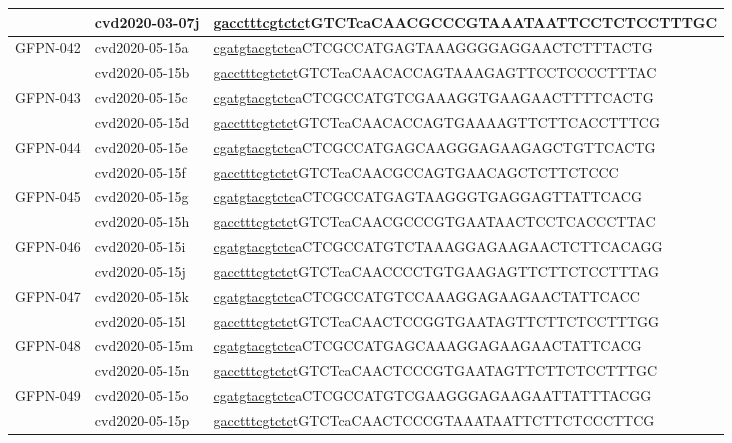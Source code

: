 \begin{landscape}
\begin{longtable}{|l|l|l|}
		& cvd2020-03-07j & \underline{gacctttcgtctc}tGTCTcaCAACGCCCGTAAATAATTCCTCTCCTTTGC \\ \hline
		\multirow{2}{*}{GFPN-042} & cvd2020-05-15a & \underline{cgatgtacgtctc}aCTCGCCATGAGTAAAGGGGAGGAACTCTTTACTG   \\ \cline{2-3} 
		& cvd2020-05-15b & \underline{gacctttcgtctc}tGTCTcaCAACACCAGTAAAGAGTTCCTCCCCTTTAC \\ \hline
		\multirow{2}{*}{GFPN-043} & cvd2020-05-15c & \underline{cgatgtacgtctc}aCTCGCCATGTCGAAAGGTGAAGAACTTTTCACTG   \\ \cline{2-3} 
		& cvd2020-05-15d & \underline{gacctttcgtctc}tGTCTcaCAACACCAGTGAAAAGTTCTTCACCTTTCG \\ \hline
		\multirow{2}{*}{GFPN-044} & cvd2020-05-15e & \underline{cgatgtacgtctc}aCTCGCCATGAGCAAGGGAGAAGAGCTGTTCACTG   \\ \cline{2-3} 
		& cvd2020-05-15f & \underline{gacctttcgtctc}tGTCTcaCAACGCCAGTGAACAGCTCTTCTCCC     \\ \hline
		\multirow{2}{*}{GFPN-045} & cvd2020-05-15g & \underline{cgatgtacgtctc}aCTCGCCATGAGTAAGGGTGAGGAGTTATTCACG    \\ \cline{2-3} 
		& cvd2020-05-15h & \underline{gacctttcgtctc}tGTCTcaCAACGCCCGTGAATAACTCCTCACCCTTAC \\ \hline
		\multirow{2}{*}{GFPN-046} & cvd2020-05-15i & \underline{cgatgtacgtctc}aCTCGCCATGTCTAAAGGAGAAGAACTCTTCACAGG  \\ \cline{2-3} 
		& cvd2020-05-15j & \underline{gacctttcgtctc}tGTCTcaCAACCCCTGTGAAGAGTTCTTCTCCTTTAG \\ \hline
		\multirow{2}{*}{GFPN-047} & cvd2020-05-15k & \underline{cgatgtacgtctc}aCTCGCCATGTCCAAAGGAGAAGAACTATTCACC    \\ \cline{2-3} 
		& cvd2020-05-15l & \underline{gacctttcgtctc}tGTCTcaCAACTCCGGTGAATAGTTCTTCTCCTTTGG \\ \hline
		\multirow{2}{*}{GFPN-048} & cvd2020-05-15m & \underline{cgatgtacgtctc}aCTCGCCATGAGCAAAGGAGAAGAACTATTCACG    \\ \cline{2-3} 
		& cvd2020-05-15n & \underline{gacctttcgtctc}tGTCTcaCAACTCCCGTGAATAGTTCTTCTCCTTTGC \\ \hline
		\multirow{2}{*}{GFPN-049} & cvd2020-05-15o & \underline{cgatgtacgtctc}aCTCGCCATGTCGAAGGGAGAAGAATTATTTACGG   \\ \cline{2-3} 
		& cvd2020-05-15p & \underline{gacctttcgtctc}tGTCTcaCAACTCCCGTAAATAATTCTTCTCCCTTCG \\ \hline
		
		
	\end{longtable}
	
\end{landscape}


